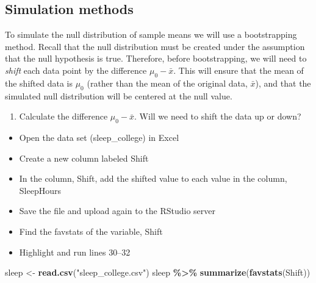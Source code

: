 \documentclass[
]{report}
\newenvironment{Shaded}{\begin{snugshade}}{\end{snugshade}}
\newcommand{\FunctionTok}[1]{\textcolor[rgb]{0.13,0.29,0.53}{\textbf{#1}}}
\newcommand{\NormalTok}[1]{#1}
\newcommand{\OtherTok}[1]{\textcolor[rgb]{0.56,0.35,0.01}{#1}}
\newcommand{\SpecialCharTok}[1]{\textcolor[rgb]{0.81,0.36,0.00}{\textbf{#1}}}
\newcommand{\StringTok}[1]{\textcolor[rgb]{0.31,0.60,0.02}{#1}}
\providecommand{\tightlist}{%
  \setlength{\itemsep}{0pt}\setlength{\parskip}{0pt}}
\begin{document}
\vspace{1in}

\subsection*{Simulation methods}\label{simulation-methods}

To simulate the null distribution of sample means we will use a bootstrapping method. Recall that the null distribution must be created under the assumption that the null hypothesis is true. Therefore, before bootstrapping, we will need to \emph{shift} each data point by the difference \(\mu_0 - \bar{x}\). This will ensure that the mean of the shifted data is \(\mu_0\) (rather than the mean of the original data, \(\bar{x}\)), and that the simulated null distribution will be centered at the null value.

\begin{enumerate}
\def\labelenumi{\arabic{enumi}.}
\setcounter{enumi}{5}
\tightlist
\item
  Calculate the difference \(\mu_0 - \bar{x}\). Will we need to shift the data up or down?
\end{enumerate}

\vspace{0.3in}

\begin{itemize}
\item
  Open the data set (sleep\_college) in Excel
\item
  Create a new column labeled Shift
\item
  In the column, Shift, add the shifted value to each value in the column, SleepHours
\item
  Save the file and upload again to the RStudio server
\item
  Find the favstats of the variable, Shift
\item
  Highlight and run lines 30--32
\end{itemize}

\begin{Shaded}
\begin{Highlighting}[]
\NormalTok{sleep }\OtherTok{\textless{}{-}} \FunctionTok{read.csv}\NormalTok{(}\StringTok{"sleep\_college.csv"}\NormalTok{)}
\NormalTok{sleep }\SpecialCharTok{\%\textgreater{}\%}
    \FunctionTok{summarize}\NormalTok{(}\FunctionTok{favstats}\NormalTok{(Shift))}
\end{Highlighting}
\end{Shaded}
\end{document}
